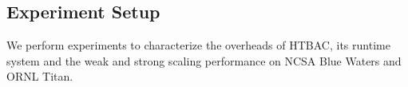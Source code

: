 
\subsection{Experiment Setup}\label{ssec:exp_design}

We perform experiments to characterize the overheads of HTBAC, its runtime
system and the weak and strong scaling performance on NCSA Blue Waters and 
ORNL Titan. 


